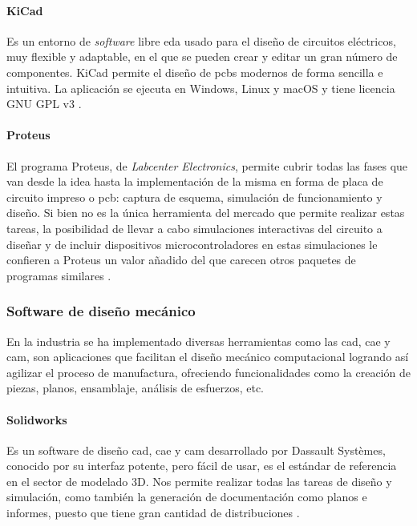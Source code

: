\paragraph{KiCad}
Es un entorno de \textit{software} libre \acrshort{eda} usado para el diseño de circuitos eléctricos, muy flexible y adaptable, en el que se pueden crear y editar un gran número de componentes. KiCad permite el diseño de \acrshort{pcb}s modernos de forma sencilla e intuitiva. La aplicación se ejecuta en Windows, Linux y macOS y tiene licencia GNU GPL v3 \citep{kicad}. 

\paragraph{Proteus}
El programa Proteus, de \textit{Labcenter Electronics}, permite cubrir todas las fases que van desde la idea hasta la implementación de la misma en forma de placa de circuito impreso o \acrshort{pcb}: captura de esquema, simulación de funcionamiento y diseño. Si bien no es la única herramienta del mercado que permite realizar estas tareas, la posibilidad de llevar a cabo simulaciones interactivas del circuito a diseñar y de incluir dispositivos microcontroladores en estas simulaciones le confieren a Proteus un valor añadido del que carecen otros paquetes de programas similares \citep{prieto2018proteus}.

\subsubsection{Software de diseño mecánico}
En la industria se ha implementado diversas herramientas como las \acrfull{cad}, \acrfull{cae} y \acrfull{cam}, son aplicaciones que facilitan el diseño mecánico computacional logrando así agilizar el proceso de manufactura, ofreciendo funcionalidades como la creación de piezas, planos, ensamblaje, análisis de esfuerzos, etc.
\paragraph{Solidworks}
Es un software de diseño \acrshort{cad}, \acrshort{cae} y \acrshort{cam} desarrollado por Dassault Systèmes, conocido por su interfaz potente, pero fácil de usar, es el estándar de referencia en el sector de modelado 3D. Nos permite realizar todas las tareas de diseño y simulación, como también la generación de documentación como planos e informes, puesto que tiene gran cantidad de distribuciones \citep{solidworks}.